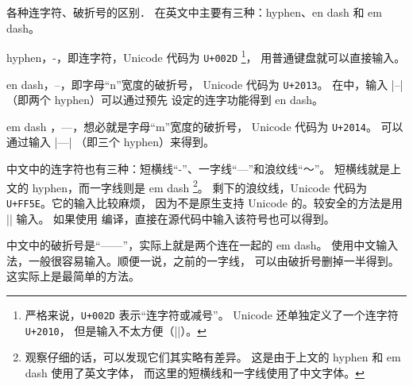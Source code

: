 \begin{myQA}{各种连字符、破折号的区别．}
在英文中主要有三种：hyphen、en dash 和 em dash。

\begin{myItemize}
\item  hyphen，-，即连字符，Unicode 代码为 \texttt{U+002D}
\footnote{严格来说，\texttt{U+002D} 表示“连字符或减号”。
	Unicode 还单独定义了一个连字符 \texttt{U+2010}，
	但是输入不太方便（\code||）。}，
用普通键盘就可以直接输入。

\item en dash，--，即字母“n”宽度的破折号，
Unicode 代码为 \texttt{U+2013}。
在\LaTeXTeX 中，输入 \code|--| （即两个 hyphen）可以通过预先
设定的连字功能得到 en dash。

\item em dash ，---，想必就是字母“m”宽度的破折号，
Unicode 代码为 \texttt{U+2014}。
可以通过输入 \code|---| （即三个 hyphen）来得到。
\end{myItemize}

\blankline

中文中的连字符也有三种：短横线“{\Songti -}”、一字线“—”和浪纹线“～”。
短横线就是上文的 hyphen，而一字线则是 em dash
\footnote{观察仔细的话，可以发现它们其实略有差异。
	这是由于上文的 hyphen 和 em dash 使用了英文字体，
	而这里的短横线和一字线使用了中文字体。}。
剩下的浪纹线，Unicode 代码为 \texttt{U+FF5E}。它的输入比较麻烦，
因为\LaTeXTeX 不是原生支持 Unicode 的。较安全的方法是用
\code|| 输入。
如果使用  编译，直接在源代码中输入该符号也可以得到。

中文中的破折号是“——”，实际上就是两个连在一起的 em dash。
使用中文输入法，一般很容易输入。顺便一说，之前的一字线，
可以由破折号删掉一半得到。这实际上是最简单的方法。
\end{myQA}

